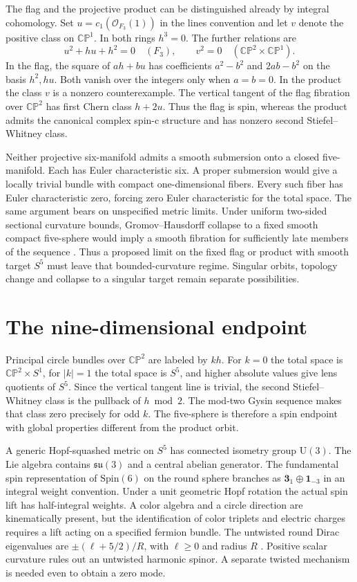 \documentclass[11pt,oneside]{article}
\newcommand{\CP}{\mathbb{CP}}
\newcommand{\su}{\mathfrak{su}}
\newcommand{\U}{\mathrm U}
\newcommand{\Spin}{\mathrm{Spin}}
\newcommand{\OO}{\mathcal O}
\begin{document}
The flag and the projective product can be distinguished already by integral cohomology. Set \(u=c_1(\OO_{F_3}(1))\) in the lines convention and let \(v\) denote the positive class on \(\CP^1\). In both rings \(h^3=0\). The further relations are
\[
 u^2+hu+h^2=0\quad(F_3),\qquad
 v^2=0\quad(\CP^2\times\CP^1).
\]
In the flag, the square of \(ah+bu\) has coefficients \(a^2-b^2\) and \(2ab-b^2\) on the basis \(h^2,hu\). Both vanish over the integers only when \(a=b=0\). In the product the class \(v\) is a nonzero counterexample. The vertical tangent of the flag fibration over \(\CP^2\) has first Chern class \(h+2u\). Thus the flag is spin, whereas the product admits the canonical complex spin-c structure and has nonzero second Stiefel--Whitney class.

Neither projective six-manifold admits a smooth submersion onto a closed five-manifold. Each has Euler characteristic six. A proper submersion would give a locally trivial bundle with compact one-dimensional fibers. Every such fiber has Euler characteristic zero, forcing zero Euler characteristic for the total space. The same argument bears on unspecified metric limits. Under uniform two-sided sectional curvature bounds, Gromov--Hausdorff collapse to a fixed smooth compact five-sphere would imply a smooth fibration for sufficiently late members of the sequence \cite{fukaya}. Thus a proposed limit on the fixed flag or product with smooth target \(S^5\) must leave that bounded-curvature regime. Singular orbits, topology change and collapse to a singular target remain separate possibilities.

\section{The nine-dimensional endpoint}
Principal circle bundles over \(\CP^2\) are labeled by \(kh\). For \(k=0\) the total space is \(\CP^2\times S^1\), for \(|k|=1\) the total space is \(S^5\), and higher absolute values give lens quotients of \(S^5\). Since the vertical tangent line is trivial, the second Stiefel--Whitney class is the pullback of \(h\bmod2\). The mod-two Gysin sequence makes that class zero precisely for odd \(k\). The five-sphere is therefore a spin endpoint with global properties different from the product orbit.

A generic Hopf-squashed metric on \(S^5\) has connected isometry group \(\U(3)\). The Lie algebra contains \(\su(3)\) and a central abelian generator. The fundamental spin representation of \(\Spin(6)\) on the round sphere branches as \(\mathbf 3_{1}\oplus\mathbf 1_{-3}\) in an integral weight convention. Under a unit geometric Hopf rotation the actual spin lift has half-integral weights. A color algebra and a circle direction are kinematically present, but the identification of color triplets and electric charges requires a lift acting on a specified fermion bundle. The untwisted round Dirac eigenvalues are \(\pm(\ell+5/2)/R\), with \(\ell\geq 0\) and radius \(R\) \cite{bar}. Positive scalar curvature rules out an untwisted harmonic spinor. A separate twisted mechanism is needed even to obtain a zero mode.
\end{document}

